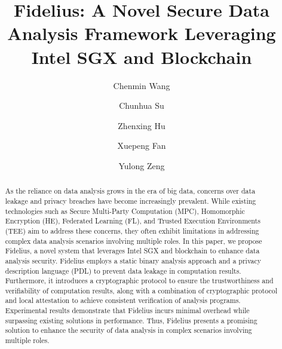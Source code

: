 \documentclass[sigconf]{acmart}
\begin{document}
\title{Fidelius: A Novel Secure Data Analysis Framework Leveraging Intel SGX and Blockchain}


\author{Chenmin Wang}

\author{Chunhua Su}

\author{Zhenxing Hu}

\author{Xuepeng Fan}

\author{Yulong Zeng}


\begin{abstract}
As the reliance on data analysis grows in the era of big data, concerns over data leakage and privacy breaches have become increasingly prevalent. While existing technologies such as Secure Multi-Party Computation (MPC), Homomorphic Encryption (HE), Federated Learning (FL), and Trusted Execution Environments (TEE) aim to address these concerns, they often exhibit limitations in addressing complex data analysis scenarios involving multiple roles. In this paper, we propose Fidelius, a novel system that leverages Intel SGX and blockchain to enhance data analysis security. Fidelius employs a static binary analysis approach and a privacy description language (PDL) to prevent data leakage in computation results. Furthermore, it introduces a cryptographic protocol to ensure the trustworthiness and verifiability of computation results, along with a combination of cryptographic protocol and local attestation to achieve consistent verification of analysis programs. Experimental results demonstrate that Fidelius incurs minimal overhead while surpassing existing solutions in performance. Thus, Fidelius presents a promising solution to enhance the security of data analysis in complex scenarios involving multiple roles.
\end{abstract}
\end{document}
